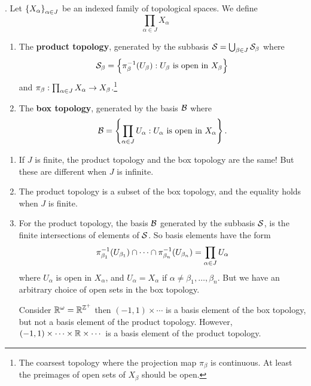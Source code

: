 . Let \(\left\{ X_\alpha \right\}_{\alpha \in J}\) be an indexed family of topological spaces. We define
\[
    \prod_{\alpha \in J} X_\alpha
\]
\begin{enumerate}
    \item The \textbf{product topology}, generated by the subbasis \(\mathcal{S} = \bigcup_{\beta \in J} \mathcal{S}_\beta\) where
          \[
              \mathcal{S}_\beta = \left\{ \pi_\beta^{-1}(U_\beta) : U_\beta \text{ is open in } X_\beta \right\}
          \]
          and \(\pi_\beta: \prod_{\alpha \in J} X_\alpha \rightarrow X_\beta\).\footnote{The coarsest topology where the projection map \(\pi_{\beta}\) is continuous. At least the preimages of open sets of \(X_\beta\) should be open.}
    \item The \textbf{box topology}, generated by the basis \(\mathcal{B}\) where
          \[
              \mathcal{B} = \left\{\prod_{\alpha \in J} U_\alpha : U_\alpha \text{ is open in } X_\alpha\right\}.
          \]
\end{enumerate}

\rmk
\begin{enumerate}
    \item If \(J\) is finite, the product topology and the box topology are the same! But these are different when \(J\) is infinite.
    \item The product topology is a subset of the box topology, and the equality holds when \(J\) is finite.
    \item For the product topology, the basis \(\mathcal{B}\) generated by the subbasis \(\mathcal{S}\), is the finite intersections of elements of \(\mathcal{S}\). So basis elements have the form
          \[
              \pi_{\beta_1}^{-1}(U_{\beta_1}) \cap \cdots \cap \pi_{\beta_n}^{-1}(U_{\beta_n}) = \prod_{\alpha \in J} U_\alpha
          \]
          where \(U_\alpha\) is open in \(X_\alpha\), and \(U_\alpha = X_\alpha\) if \(\alpha \neq \beta_1, \dots, \beta_n\). But we have an arbitrary choice of open sets in the box topology.

          Consider \(\mathbb{R}^\omega = \mathbb{R}^{\mathbb{Z}^+}\) then \((-1, 1) \times \cdots\) is a basis element of the box topology, but not a basis element of the product topology. However, \((-1, 1) \times \cdots \times \mathbb{R} \times \cdots\) is a basis element of the product topology.
\end{enumerate}

\pagebreak
